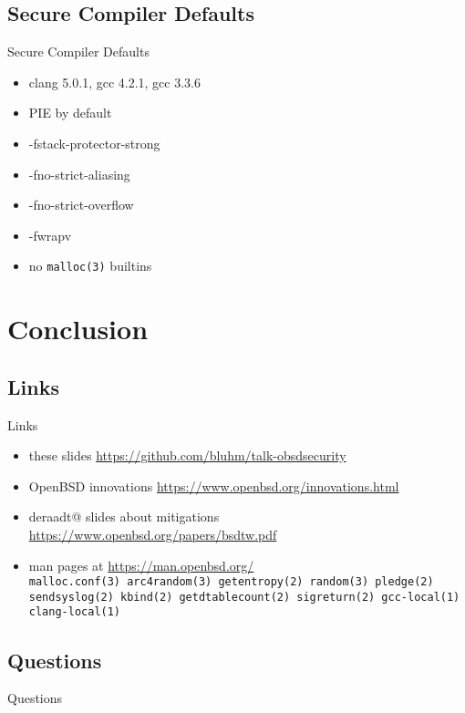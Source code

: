 \documentclass[14pt]{beamer}
\begin{document}
\subsection{Secure Compiler Defaults}
\begin{frame}{Secure Compiler Defaults}
\begin{itemize}
    \item clang 5.0.1, gcc 4.2.1, gcc 3.3.6
    \item PIE by default
    \item -fstack-protector-strong
    \item -fno-strict-aliasing
    \item -fno-strict-overflow
    \item -fwrapv
    \item no \texttt{malloc(3)} builtins
\end{itemize}
\end{frame}

\section{Conclusion}

\subsection{Links}
\begin{frame}{Links}
\begin{itemize}
    \item these slides
	{\small \url{https://github.com/bluhm/talk-obsdsecurity}}
    \item OpenBSD innovations
	{\small \url{https://www.openbsd.org/innovations.html}}
    \item deraadt@ slides about mitigations
	{\small \url{https://www.openbsd.org/papers/bsdtw.pdf}}
    \item man pages at {\small \url{https://man.openbsd.org/}}\\
	\texttt{malloc.conf(3)
	arc4random(3)
	getentropy(2)
	random(3)
	pledge(2)
	sendsyslog(2)
	kbind(2)
	getdtablecount(2)
	sigreturn(2)
	gcc-local(1)
	clang-local(1)}
\end{itemize}
\end{frame}

\subsection{Questions}
\begin{frame}{Questions}
\begin{center}
\end{center}
\end{frame}
\end{document}
